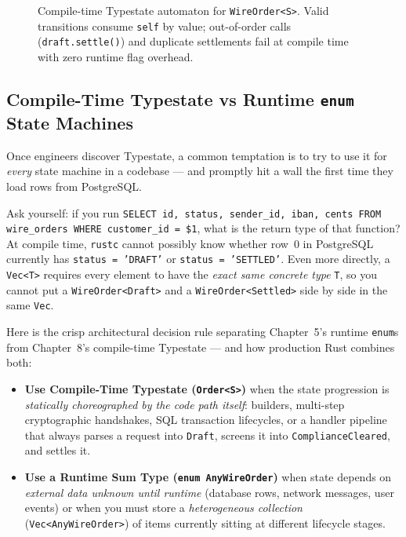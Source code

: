 \begin{figure}[H]
\caption{Compile-time Typestate automaton for \texttt{WireOrder<S>}. Valid transitions consume \texttt{self} by value; out-of-order calls (\texttt{draft.settle()}) and duplicate settlements fail at compile time with zero runtime flag overhead.}
\label{ch08:fig-typestate-automaton}
\end{figure}

\subsection{Compile-Time Typestate vs Runtime \texttt{enum} State Machines}

Once engineers discover Typestate, a common temptation is to try to use it for \emph{every} state machine in a codebase --- and promptly hit a wall the first time they load rows from PostgreSQL.

Ask yourself: if you run \texttt{SELECT id, status, sender\_id, iban, cents FROM wire\_orders WHERE customer\_id = \$1}, what is the return type of that function? At compile time, \texttt{rustc} cannot possibly know whether row~0 in PostgreSQL currently has \texttt{status = 'DRAFT'} or \texttt{status = 'SETTLED'}. Even more directly, a \texttt{Vec<T>} requires every element to have the \emph{exact same concrete type} \texttt{T}, so you cannot put a \texttt{WireOrder<Draft>} and a \texttt{WireOrder<Settled>} side by side in the same \texttt{Vec}.

Here is the crisp architectural decision rule separating Chapter~5's runtime \texttt{enum}s from Chapter~8's compile-time Typestate --- and how production Rust combines both:

\begin{intuitionbox}
\begin{itemize}
  \item \textbf{Use Compile-Time Typestate (\texttt{Order<S>})} when the state progression is \emph{statically choreographed by the code path itself}: builders, multi-step cryptographic handshakes, SQL transaction lifecycles, or a handler pipeline that always parses a request into \texttt{Draft}, screens it into \texttt{ComplianceCleared}, and settles it.
  \item \textbf{Use a Runtime Sum Type (\texttt{enum AnyWireOrder})} when state depends on \emph{external data unknown until runtime} (database rows, network messages, user events) or when you must store a \emph{heterogeneous collection} (\texttt{Vec<AnyWireOrder>}) of items currently sitting at different lifecycle stages.
\end{itemize}
\end{intuitionbox}

